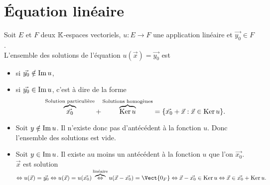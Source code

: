\documentclass{book}
\begin{document}
\section{Équation linéaire}
\begin{Theoreme}[Solutions d'une équation linéaire $u (\vec{x}) = \vec{y_0}$]
Soit $E$ et $F$ deux $\mathbb{K} $-espaces vectoriels, $u:E\to F$ une application linéaire et $\vec{y_0}\in F$.\\
L'ensemble des solutions de l'équation $u (\vec{x}) = \vec{y_0}$ est
\begin{itemize}
\item {} si $\vec{y_0}\notin \operatorname{Im} u$,
\item {} si $\vec{y_0}\in \operatorname{Im} u$, c'est à dire de la forme $$\overbrace{\vec{x_0}}^{\text{Solution particulière}}+\overbrace{\operatorname{Ker} u}^{\text{Solutions homogènes}}=\{\vec{x_0}+\vec{x}:\vec{x}\in\operatorname{Ker} u\}.$$ 
\end{itemize}
\end{Theoreme}
\begin{Demonstration}
\begin{itemize}
\item Soit $y\notin \operatorname{Im} u$. Il n'existe donc pas d'antécédent à la fonction $u$. Donc l'ensemble des solutions est vide.
\item Soit $y\in \operatorname{Im} u$. Il existe au moins un antécédent à la fonction $u$ que l'on $\vec{x_0}$.\\
$\vec{x}$ est solution $ \Leftrightarrow u (\vec{x}) = \vec{y_0} \Leftrightarrow u (\vec{x}) = u (\vec{x_0}) \overbrace{\Leftrightarrow}^{\text{linéaire}} u(\vec{x}-\vec{x_0})=\Vect{0_F} \Leftrightarrow  \vec{x} - \vec{x_0} \in \Ker u  \Leftrightarrow \vec{x} \in \vec{x_0} +\Ker u.$
\end{itemize}
\end{Demonstration}
\end{document}
